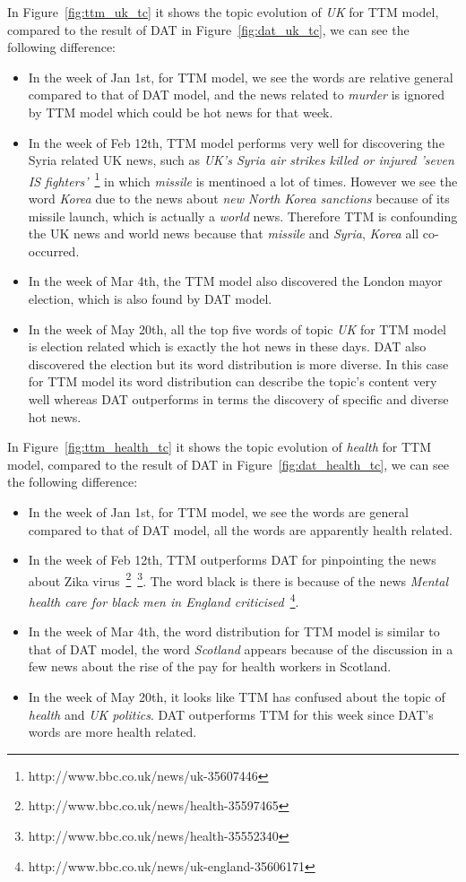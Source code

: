 In Figure~\ref{fig:ttm_uk_tc} it shows the topic evolution of \textit{UK} for TTM model, compared to the result of DAT in Figure~\ref{fig:dat_uk_tc}, we can see the following difference:
\begin{itemize}
    \item In the week of Jan 1st, for TTM model, we see the words are relative general compared to that of DAT model, and the news related to \textit{murder} is ignored by TTM model which could be hot news for that week. 
    \item In the week of Feb 12th, TTM model performs very well for discovering the Syria related UK news, such as \textit{UK's Syria air strikes killed or injured 'seven IS fighters'}~\footnote{http://www.bbc.co.uk/news/uk-35607446} in which \textit{missile} is mentinoed a lot of times. However we see the word \textit{Korea} due to the news about \textit{new North Korea sanctions} because of its missile launch, which is actually a \textit{world} news. Therefore TTM is confounding the UK news and world news because that \textit{missile} and \textit{Syria}, \textit{Korea} all co-occurred.
    \item In the week of Mar 4th, the TTM model also discovered the London mayor election, which is also found by DAT model. 
    \item In the week of May 20th, all the top five words of topic \textit{UK} for TTM model is election related which is exactly the hot news in these days. DAT also discovered the election but its word distribution is more diverse. In this case for TTM model its word distribution can describe the topic's content very well whereas DAT outperforms in terms  the discovery of specific and diverse hot news.
    \end{itemize}
    
In Figure~\ref{fig:ttm_health_tc} it shows the topic evolution of \textit{health} for TTM model, compared to the result of DAT in Figure~\ref{fig:dat_health_tc}, we can see the following difference:
\begin{itemize}
    \item In the week of Jan 1st, for TTM model, we see the words are general compared to that of DAT model, all the words are apparently health related.
    \item In the week of Feb 12th, TTM outperforms DAT for pinpointing the news about Zika virus~\footnote{http://www.bbc.co.uk/news/health-35597465}~\footnote{http://www.bbc.co.uk/news/health-35552340}. The word black is there is because of the news \textit{Mental health care for black men in England criticised}~\footnote{http://www.bbc.co.uk/news/uk-england-35606171}.
    \item In the week of Mar 4th, the word distribution for TTM model is similar to that of DAT model, the word \textit{Scotland} appears because of the discussion in a few news about the rise of the pay for health workers in Scotland.
    \item In the week of May 20th, it looks like TTM has confused about the topic of \textit{health} and \textit{UK politics}. DAT outperforms TTM for this week since DAT's words are more health related.
    \end{itemize}

